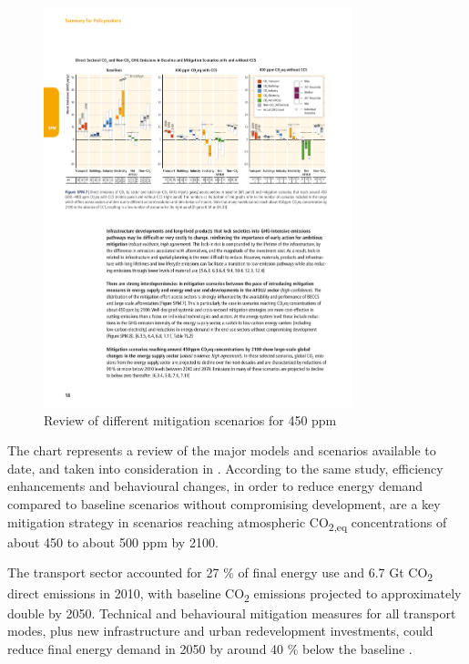 \begin{figure}[ht]
  \centering
  \includegraphics[width=0.8\textwidth]{figures/introduction/mitigation_scenarios.pdf}
  \caption{Review of different mitigation scenarios for 450 ppm \label{fig:mitigationscenarios}}
\end{figure}

The chart represents a review of the major models and scenarios available to date, and taken into consideration in \cite{IPCC2014}. According to the same study, efficiency enhancements and behavioural changes, in order to reduce energy demand compared to baseline scenarios without compromising development, are a key mitigation strategy in scenarios reaching atmospheric CO\textsubscript{2,eq} concentrations of about 450 to about 500 ppm by 2100.

The transport sector accounted for 27 \% of final energy use and 6.7 Gt CO\textsubscript{2} direct emissions in 2010, with baseline CO\textsubscript{2} emissions projected to approximately double by 2050. Technical and behavioural mitigation measures for all transport modes, plus new infrastructure and urban redevelopment investments, could reduce final energy demand in 2050 by around 40 \% below the baseline \cite{IPCC2014}.

